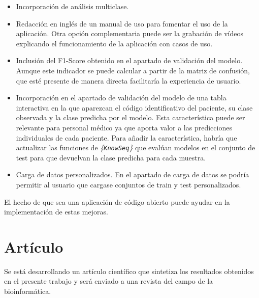 \begin{itemize}
	\item Incorporación de análisis multiclase. 
	\item Redacción en inglés de un manual de uso para fomentar el uso de la aplicación. Otra opción complementaria puede ser la grabación de vídeos explicando el funcionamiento de la aplicación con casos de uso.
	\item Inclusión del F1-Score obtenido en el apartado de validación del modelo. Aunque este indicador se puede calcular a partir de la matriz de confusión, que esté presente de manera directa facilitaría la experiencia de usuario.
	\item Incorporación en el apartado de validación del modelo de una tabla interactiva en la que aparezcan el código identificativo del paciente, su clase observada y la clase predicha por el modelo. Esta característica puede ser relevante para personal médico ya que aporta valor a las predicciones individuales de cada paciente. Para añadir la característica, habría que actualizar las funciones de \textit{\{\texttt{KnowSeq}\}} que evalúan modelos en el conjunto de test para que devuelvan la clase predicha para cada muestra.
	\item Carga de datos personalizados. En el apartado de carga de datos se podría permitir al usuario que cargase conjuntos de train y test personalizados.
\end{itemize}

El hecho de que sea una aplicación de código abierto puede ayudar en la implementación de estas mejoras.

\section{Artículo}

Se está desarrollando un artículo científico que sintetiza los resultados obtenidos en el presente trabajo y será enviado a una revista del campo de la bioinformática.